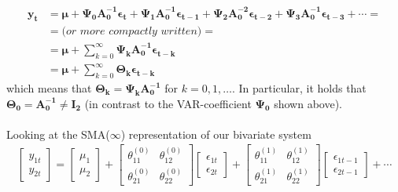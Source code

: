 \documentclass[a4paper,11pt,listof=nochaptergap,oneside,pointednumbers,bibtotoc,bigheadings,liststotoc]{scrbook}
\theoremstyle{mysatz}
\theoremstyle{mydefinition}
\theoremstyle{mybemerkung}
\newcommand{\vect}[1]{\boldsymbol{\mathbf{#1}}}
\begin{document}
\begin{equation} \label{eq:svar8}
\begin{split}
 			\vect{y_t} & = \vect{\mu} + \vect{\Psi_0}\vect{A_0^{-1}}\vect{\epsilon_t} + \vect{\Psi_1}\vect{A_0^{-1}}\vect{\epsilon_{t-1}} + \vect{\Psi_{2}}\vect{A_0^{-2}}\vect{\epsilon_{t-2}} + \vect{\Psi_{3}}\vect{A_0^{-1}}\vect{\epsilon_{t-3}} + \cdots = \\
			& = \textit{(or more compactly written)} = \\
			& = \vect{\mu} + \sum\limits_{k=0}^\infty \vect{\Psi_k}\vect{A_0^{-1}}\vect{\epsilon_{t-k}} \\
			& = \vect{\mu} + \sum\limits_{k=0}^\infty \vect{\Theta_k}\vect{\epsilon_{t-k}}
\end{split}								
\end{equation}
which means that $\vect{\Theta_k} = \vect{\Psi_k}\vect{A_0^{-1}}$ for $k = 0, 1, \dots$. In particular, it holds that $\vect{\Theta_0}=\vect{A_0^{-1}} \neq \vect{I_2}$ (in contrast to the VAR-coefficient $\vect{\Psi_0}$ shown above). \\
\\
Looking at the SMA($\infty$) representation of our bivariate system 
\begin{equation} \label{eq:svar9}
\begin{split}
	\begin{bmatrix}
    	y_{1t} \\
    	y_{2t}
 	\end{bmatrix} 
	=
	\begin{bmatrix}
    	\mu_1 \\
    	\mu_2
 	\end{bmatrix} + 
	\begin{bmatrix}
    	\theta_{11}^{(0)} & \theta_{12}^{(0)}\\
    	\theta_{21}^{(0)} & \theta_{22}^{(0)}
 	\end{bmatrix} 
	\begin{bmatrix}
    	\epsilon_{1t} \\
	\epsilon_{2t}
 	\end{bmatrix} + 
	\begin{bmatrix}
    	\theta_{11}^{(1)} & \theta_{12}^{(1)}\\
    	\theta_{21}^{(1)} & \theta_{22}^{(1)}
 	\end{bmatrix} 
	\begin{bmatrix}
    	\epsilon_{1t-1} \\
	\epsilon_{2t-1}
 	\end{bmatrix} + \cdots 
\end{split}								
\end{equation}
\end{document}
